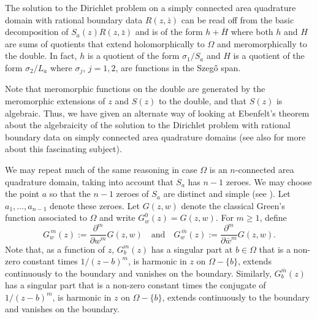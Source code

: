 \documentclass[12pt]{amsart}
\newcommand\dee{\partial}
\newcommand\Om{\Omega}
\numberwithin{equation}{section}
\begin{document}
\begin{thm}
\label{thmA}
The solution to the Dirichlet problem on a simply
connected area quadrature domain with rational boundary data
$R(z,\bar z)$ can be read off from the basic decomposition
of $S_a(z)R(z,\bar z)$ and is of the form $h+\overline{H}$
where both $h$ and $H$ are sums of quotients that extend
holomorphically to $\Om$ and meromorphically to the double.
In fact, $h$ is a quotient of the form $\sigma_1/S_a$
and $H$ is a quotient of the form $\sigma_2/L_a$ where
$\sigma_j$, $j=1,2$, are functions in the Szeg\H o span.
\end{thm}

Note that meromorphic functions on the double are generated
by the meromorphic extensions of $z$ and $S(z)$ to the double,
and that $S(z)$ is algebraic. Thus, we have given an alternate
way of looking at Ebenfelt's theorem \cite{E} about the
algebraicity of the solution to the Dirichlet problem
with rational boundary data on simply connected area
quadrature domains (see also \cite{BEKS} for more about
this fascinating subject).

We may repeat much of the same reasoning in case $\Om$
is an $n$-connected area quadrature domain, taking
into account that $S_a$ has $n-1$ zeroes. We may choose
the point $a$ so that the $n-1$ zeroes of $S_a$ are
distinct and simple (see \cite[p.~105]{B1}). Let
$a_1,\dots,a_{n-1}$ denote these zeroes. Let $G(z,w)$
denote the classical Green's function associated to
$\Om$ and write $G_w^0(z)=G(z,w)$. For $m\ge 1$, define
$$G_w^{\,m}(z):=\frac{\dee^m}{\dee w^m}G(z,w)\quad\text{and}\quad
G_w^{\,\bar m}(z):=\frac{\dee^m}{\dee \bar w^m}G(z,w).
$$
Note that, as a function of $z$, $G_b^m(z)$ has a
singular part at $b\in\Om$ that is a non-zero constant
times $1/(z-b)^m$, is harmonic in $z$ on
$\Om-\{b\}$, extends continuously to the boundary
and vanishes on the boundary. Similarly,
$G_b^{\bar m}(z)$ has a
singular part that is a non-zero constant
times the conjugate of $1/(z-b)^m$, is harmonic in $z$ on
$\Om-\{b\}$, extends continuously to the boundary
and vanishes on the boundary.
\end{document}
